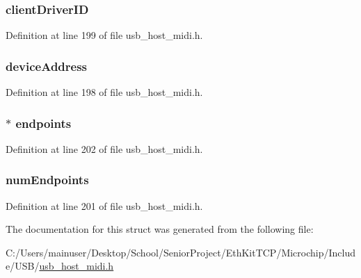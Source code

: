 \subsubsection[{client\+Driver\+I\+D}]{ client\+Driver\+I\+D}\label{struct_m_i_d_i___d_e_v_i_c_e_a343912ad63712ea60903f5acd92efc9e}


Definition at line 199 of file usb\+\_\+host\+\_\+midi.\+h.

\hypertarget{struct_m_i_d_i___d_e_v_i_c_e_aa1d659071a17ee8d0172d34d6783b517}{}
\subsubsection[{device\+Address}]{ device\+Address}\label{struct_m_i_d_i___d_e_v_i_c_e_aa1d659071a17ee8d0172d34d6783b517}


Definition at line 198 of file usb\+\_\+host\+\_\+midi.\+h.

\hypertarget{struct_m_i_d_i___d_e_v_i_c_e_a46d14c1e74e6c158ffacfc8d79ee560a}{}
\subsubsection[{endpoints}]{$\ast$ endpoints}\label{struct_m_i_d_i___d_e_v_i_c_e_a46d14c1e74e6c158ffacfc8d79ee560a}


Definition at line 202 of file usb\+\_\+host\+\_\+midi.\+h.

\hypertarget{struct_m_i_d_i___d_e_v_i_c_e_a3954ebb7f1ab01729d786f773a1c577f}{}
\subsubsection[{num\+Endpoints}]{ num\+Endpoints}\label{struct_m_i_d_i___d_e_v_i_c_e_a3954ebb7f1ab01729d786f773a1c577f}


Definition at line 201 of file usb\+\_\+host\+\_\+midi.\+h.



The documentation for this struct was generated from the following file\+:\begin{DoxyCompactItemize}
\item 
C\+:/\+Users/mainuser/\+Desktop/\+School/\+Senior\+Project/\+Eth\+Kit\+T\+C\+P/\+Microchip/\+Include/\+U\+S\+B/\hyperlink{usb__host__midi_8h}{usb\+\_\+host\+\_\+midi.\+h}\end{DoxyCompactItemize}
